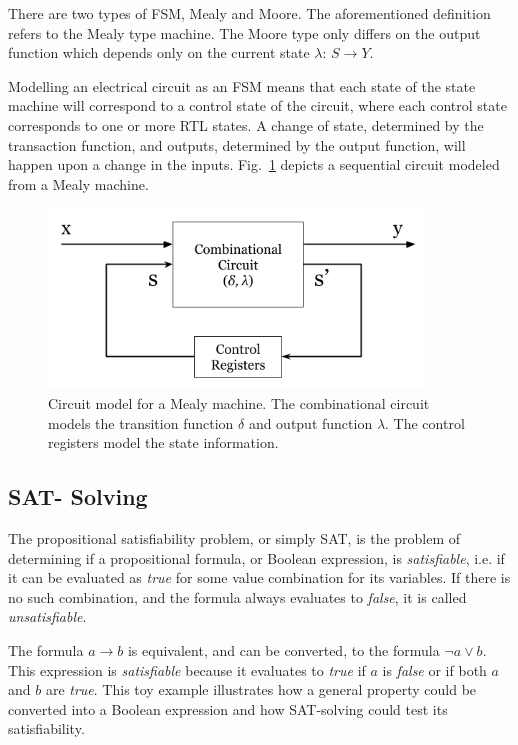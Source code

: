 There are two types of FSM, Mealy and Moore. The aforementioned definition refers to the Mealy type machine. The Moore type only differs on the output function which depends only on the current state $\lambda$: $S \to Y$.

Modelling an electrical circuit as an FSM means that each state of the state machine will correspond to a control state of the circuit, where each control state corresponds to one or more RTL states. A change of state, determined by the transaction function, and outputs, determined by the output function, will happen upon a change in the inputs. Fig.~\ref{fig:mealy_circuit} depicts a sequential circuit modeled from a Mealy machine.

\begin{figure}[htb!]
	\centering
	\includegraphics[width=10cm]{images/mealy_circuit.png}
	\caption{Circuit model for a Mealy machine. The combinational circuit models the transition function $\delta$ and output function $\lambda$. The control registers model the state information.}
	\label{fig:mealy_circuit}
\end{figure}

\subsection*{SAT- Solving}

The propositional satisfiability problem, or simply SAT, is the problem of determining if a propositional formula, or Boolean expression, is \textit{satisfiable}, i.e. if it can be evaluated as \textit{true} for some value combination for its variables. If there is no such combination, and the formula always evaluates to \textit{false}, it is called \textit{unsatisfiable}. 

The formula $a \longrightarrow b$ is equivalent, and can be converted, to the formula $\neg a \lor  b$. This expression is \textit{satisfiable} because it evaluates to \textit{true} if $a$ is \textit{false} or if both $a$ and $b$ are \textit{true}. This toy example illustrates how a general property could be converted into a Boolean expression and how SAT-solving could test its satisfiability.

